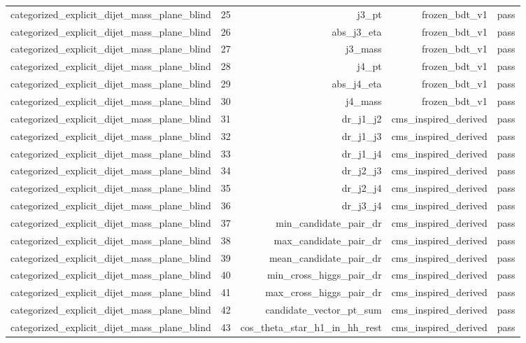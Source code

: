 \begin{table}[htbp]
\begin{tabular}{lrrrr}
categorized\_explicit\_dijet\_mass\_plane\_blind & 25 & j3\_pt & frozen\_bdt\_v1 & pass \\
categorized\_explicit\_dijet\_mass\_plane\_blind & 26 & abs\_j3\_eta & frozen\_bdt\_v1 & pass \\
categorized\_explicit\_dijet\_mass\_plane\_blind & 27 & j3\_mass & frozen\_bdt\_v1 & pass \\
categorized\_explicit\_dijet\_mass\_plane\_blind & 28 & j4\_pt & frozen\_bdt\_v1 & pass \\
categorized\_explicit\_dijet\_mass\_plane\_blind & 29 & abs\_j4\_eta & frozen\_bdt\_v1 & pass \\
categorized\_explicit\_dijet\_mass\_plane\_blind & 30 & j4\_mass & frozen\_bdt\_v1 & pass \\
categorized\_explicit\_dijet\_mass\_plane\_blind & 31 & dr\_j1\_j2 & cms\_inspired\_derived & pass \\
categorized\_explicit\_dijet\_mass\_plane\_blind & 32 & dr\_j1\_j3 & cms\_inspired\_derived & pass \\
categorized\_explicit\_dijet\_mass\_plane\_blind & 33 & dr\_j1\_j4 & cms\_inspired\_derived & pass \\
categorized\_explicit\_dijet\_mass\_plane\_blind & 34 & dr\_j2\_j3 & cms\_inspired\_derived & pass \\
categorized\_explicit\_dijet\_mass\_plane\_blind & 35 & dr\_j2\_j4 & cms\_inspired\_derived & pass \\
categorized\_explicit\_dijet\_mass\_plane\_blind & 36 & dr\_j3\_j4 & cms\_inspired\_derived & pass \\
categorized\_explicit\_dijet\_mass\_plane\_blind & 37 & min\_candidate\_pair\_dr & cms\_inspired\_derived & pass \\
categorized\_explicit\_dijet\_mass\_plane\_blind & 38 & max\_candidate\_pair\_dr & cms\_inspired\_derived & pass \\
categorized\_explicit\_dijet\_mass\_plane\_blind & 39 & mean\_candidate\_pair\_dr & cms\_inspired\_derived & pass \\
categorized\_explicit\_dijet\_mass\_plane\_blind & 40 & min\_cross\_higgs\_pair\_dr & cms\_inspired\_derived & pass \\
categorized\_explicit\_dijet\_mass\_plane\_blind & 41 & max\_cross\_higgs\_pair\_dr & cms\_inspired\_derived & pass \\
categorized\_explicit\_dijet\_mass\_plane\_blind & 42 & candidate\_vector\_pt\_sum & cms\_inspired\_derived & pass \\
categorized\_explicit\_dijet\_mass\_plane\_blind & 43 & cos\_theta\_star\_h1\_in\_hh\_rest & cms\_inspired\_derived & pass \\

\end{tabular}
\end{table}
